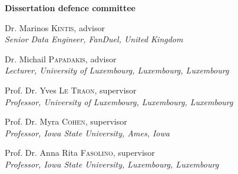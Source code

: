 \begin{adjustwidth*}{1em}{1em}

\noindent
\textbf{\large Dissertation defence committee}


\vspace{0.2cm}
\noindent
Dr.  Marinos \textsc{Kintis}, advisor\\
{\small \emph{Senior Data Engineer, FanDuel, United Kingdom}}   

\vspace{0.2cm}
\noindent
Dr. Michail \textsc{Papadakis}, advisor\\
{\small \emph{Lecturer, University of Luxembourg, Luxembourg, Luxembourg}}   

\vspace{0.2cm}
\noindent
Prof. Dr. Yves \textsc{Le Traon}, supervisor\\
{\small \emph{Professor, University of Luxembourg, Luxembourg, Luxembourg}}

\vspace{0.2cm}
\noindent
Prof. Dr. Myra \textsc{Cohen}, supervisor\\
{\small \emph{Professor, Iowa State University, Ames, Iowa}}

\vspace{0.2cm}
\noindent
Prof. Dr. Anna Rita \textsc{Fasolino}, supervisor\\
{\small \emph{Professor, Iowa State University, Luxembourg, Luxembourg}}

\end{adjustwidth*}

\restoregeometry